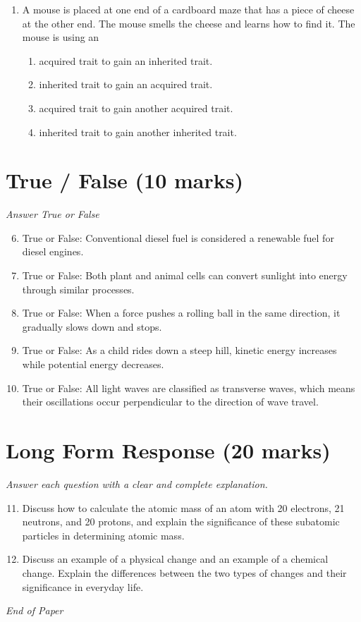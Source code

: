 \documentclass[12pt]{article}
\begin{document}
\begin{enumerate}[label=\arabic*.]
\begin{enumerate}[label=(\alph*)]
    \item Closing an electric circuit has produced light.
    \item Opening an electric circuit has produced light.
\end{enumerate}
\item A mouse is placed at one end of a cardboard maze that has a piece of cheese at the other end. The mouse smells the cheese and learns how to find it. The mouse is using an
\begin{enumerate}[label=(\alph*)]
    \item acquired trait to gain an inherited trait.
    \item inherited trait to gain an acquired trait.
    \item acquired trait to gain another acquired trait.
    \item inherited trait to gain another inherited trait.
\end{enumerate}
\end{enumerate}

\section*{True / False (10 marks)}
\textit{Answer True or False}
\begin{enumerate}[label=\arabic*.]
\setcounter{enumi}{5}
\item True or False: Conventional diesel fuel is considered a renewable fuel for diesel engines.
\item True or False: Both plant and animal cells can convert sunlight into energy through similar processes.
\item True or False: When a force pushes a rolling ball in the same direction, it gradually slows down and stops.
\item True or False: As a child rides down a steep hill, kinetic energy increases while potential energy decreases.
\item True or False: All light waves are classified as transverse waves, which means their oscillations occur perpendicular to the direction of wave travel.
\end{enumerate}

\section*{Long Form Response (20 marks)}
\textit{Answer each question with a clear and complete explanation.}
\begin{enumerate}[label=\arabic*.]
\setcounter{enumi}{10}
\item Discuss how to calculate the atomic mass of an atom with 20 electrons, 21 neutrons, and 20 protons, and explain the significance of these subatomic particles in determining atomic mass.
\item Discuss an example of a physical change and an example of a chemical change. Explain the differences between the two types of changes and their significance in everyday life.
\end{enumerate}

\vfill
\noindent\textit{End of Paper}
\end{document}
